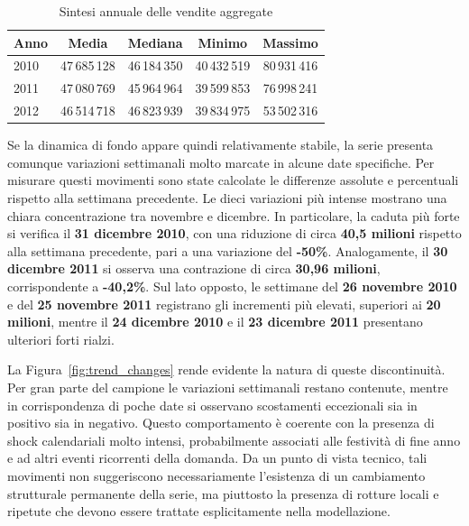 \documentclass[a4paper,12pt]{article}
\begin{document}
\begin{table}[H]
\centering
\caption{Sintesi annuale delle vendite aggregate}
\label{tab:yearly_summary}
\begin{tabular}{lcccc}
\toprule
\textbf{Anno} & \textbf{Media} & \textbf{Mediana} & \textbf{Minimo} & \textbf{Massimo} \\
\midrule
2010 & 47\,685\,128 & 46\,184\,350 & 40\,432\,519 & 80\,931\,416 \\
2011 & 47\,080\,769 & 45\,964\,964 & 39\,599\,853 & 76\,998\,241 \\
2012 & 46\,514\,718 & 46\,823\,939 & 39\,834\,975 & 53\,502\,316 \\
\bottomrule
\end{tabular}
\end{table}

Se la dinamica di fondo appare quindi relativamente stabile, la serie presenta comunque variazioni settimanali molto marcate in alcune date specifiche. Per misurare questi movimenti sono state calcolate le differenze assolute e percentuali rispetto alla settimana precedente. Le dieci variazioni più intense mostrano una chiara concentrazione tra novembre e dicembre. In particolare, la caduta più forte si verifica il \textbf{31 dicembre 2010}, con una riduzione di circa \textbf{40,5 milioni} rispetto alla settimana precedente, pari a una variazione del \textbf{-50\%}. Analogamente, il \textbf{30 dicembre 2011} si osserva una contrazione di circa \textbf{30,96 milioni}, corrispondente a \textbf{-40,2\%}. Sul lato opposto, le settimane del \textbf{26 novembre 2010} e del \textbf{25 novembre 2011} registrano gli incrementi più elevati, superiori ai \textbf{20 milioni}, mentre il \textbf{24 dicembre 2010} e il \textbf{23 dicembre 2011} presentano ulteriori forti rialzi.

La Figura~\ref{fig:trend_changes} rende evidente la natura di queste discontinuità. Per gran parte del campione le variazioni settimanali restano contenute, mentre in corrispondenza di poche date si osservano scostamenti eccezionali sia in positivo sia in negativo. Questo comportamento è coerente con la presenza di shock calendariali molto intensi, probabilmente associati alle festività di fine anno e ad altri eventi ricorrenti della domanda. Da un punto di vista tecnico, tali movimenti non suggeriscono necessariamente l’esistenza di un cambiamento strutturale permanente della serie, ma piuttosto la presenza di rotture locali e ripetute che devono essere trattate esplicitamente nella modellazione.
\end{document}
